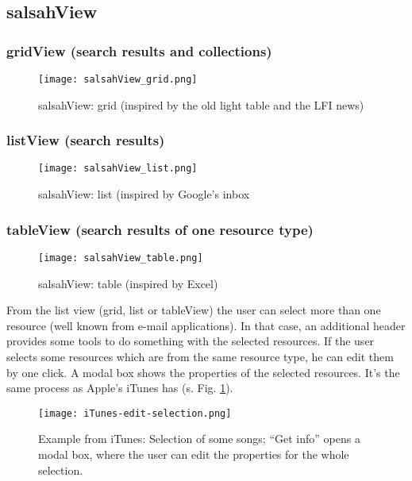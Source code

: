 \newpage
\subsection{salsahView}
\subsubsection{gridView (search results and collections)}
\begin{figure}[!h]
    \centering
    \texttt{[image: salsahView\_grid.png]}
    \caption{salsahView: grid (inspired by the old light table and the LFI news)}
\end{figure}

\subsubsection{listView (search results)}
\begin{figure}[!h]
    \centering
    \texttt{[image: salsahView\_list.png]}
    \caption{salsahView: list (inspired by Google's inbox}
\end{figure}

\newpage

\subsubsection{tableView (search results of one resource type)}
\begin{figure}[!h]
    \centering
    \texttt{[image: salsahView\_table.png]}
    \caption{salsahView: table (inspired by Excel)}
\end{figure}

From the list view (grid, list or tableView) the user can select more than one resource (well known from e-mail applications). In that case, an additional header provides some tools to do something with the selected resources. If the user selects some resources which are from the same resource type, he can edit them by one click. A modal box shows the properties of the selected resources. It's the same process as Apple's iTunes has (s. Fig. \ref{fig:itunes}).

\begin{figure}[!h]
    \centering
    \texttt{[image: iTunes-edit-selection.png]}
    \caption{Example from iTunes: Selection of some songs; ``Get info'' opens a modal box, where the user can edit the properties for the whole selection.}
    \label{fig:itunes}
\end{figure}




